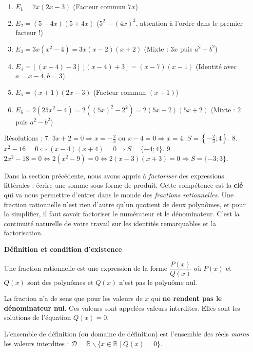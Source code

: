 \documentclass[11pt]{article}
\newcommand{\cle}[1]{{\popxbold\color{popdark}#1}}
\newcounter{popsec}
\newcounter{popsub}
\newcommand{\courssub}[1]{%
  \stepcounter{popsub}%
  \par\vspace{9pt}\noindent{\popxbold\fontsize{11.5}{13}\selectfont\color{popink}{\color{poporange}\thepopsec.\thepopsub}\hspace{6pt}#1}\par\nopagebreak\vspace{4pt}
}
\def\setminus{\mathbin{\backslash}}\let\smallsetminus\setminus
\begin{document}
\begin{corrige}
\begin{enumerate}
    \item $E_1 = 7x(2x - 3)$ \quad (Facteur commun $7x$)
    \item $E_2 = (5 - 4x)(5 + 4x)$ \quad ($5^2 - (4x)^2$, attention à l'ordre dans le premier facteur !)
    \item $E_3 = 3x(x^2 - 4) = 3x(x-2)(x+2)$ \quad (Mixte : $3x$ puis $a^2-b^2$)
    \item $E_4 = [(x-4)-3][(x-4)+3] = (x-7)(x-1)$ \quad (Identité avec $a=x-4, b=3$)
    \item $E_5 = (x+1)(2x-3)$ \quad (Facteur commun $(x+1)$)
    \item $E_6 = 2(25x^2 - 4) = 2((5x)^2 - 2^2) = 2(5x-2)(5x+2)$ \quad (Mixte : $2$ puis $a^2-b^2$)
\end{enumerate}
Résolutions :
7. $3x+2=0 \Rightarrow x=-\frac{2}{3}$ ou $x-4=0 \Rightarrow x=4$. $S=\left\{-\frac{2}{3}; 4\right\}$.
8. $x^2-16=0 \Leftrightarrow (x-4)(x+4)=0 \Rightarrow S=\{-4; 4\}$.
9. $2x^2-18=0 \Leftrightarrow 2(x^2-9)=0 \Leftrightarrow 2(x-3)(x+3)=0 \Rightarrow S=\{-3; 3\}$.
\end{corrige}

\courssub{Fractions rationnelles}

Dans la section précédente, nous avons appris à \emph{factoriser} des expressions littérales : écrire une somme sous forme de produit. Cette compétence est la \textbf{clé} qui va nous permettre d'entrer dans le monde des \emph{fractions rationnelles}. Une fraction rationnelle n'est rien d'autre qu'un quotient de deux polynômes, et pour la simplifier, il faut savoir factoriser le numérateur et le dénominateur. C'est la continuité naturelle de votre travail sur les identités remarquables et la factorisation.

\textbf{Définition et condition d'existence}\par

\begin{definition}
Une \cle{fraction rationnelle} est une expression de la forme $\dfrac{P(x)}{Q(x)}$ où $P(x)$ et $Q(x)$ sont des polynômes et $Q(x)$ n'est pas le polynôme nul.

La fraction n'a de sens que pour les valeurs de $x$ qui \textbf{ne rendent pas le dénominateur nul}. Ces valeurs sont appelées \cle{valeurs interdites}. Elles sont les solutions de l'équation $Q(x) = 0$.

L'\cle{ensemble de définition} (ou domaine de définition) est l'ensemble des réels \emph{moins} les valeurs interdites : $\mathcal{D} = \mathbb{R} \setminus \{x \in \mathbb{R} \mid Q(x) = 0\}$.
\end{definition}
\end{document}
